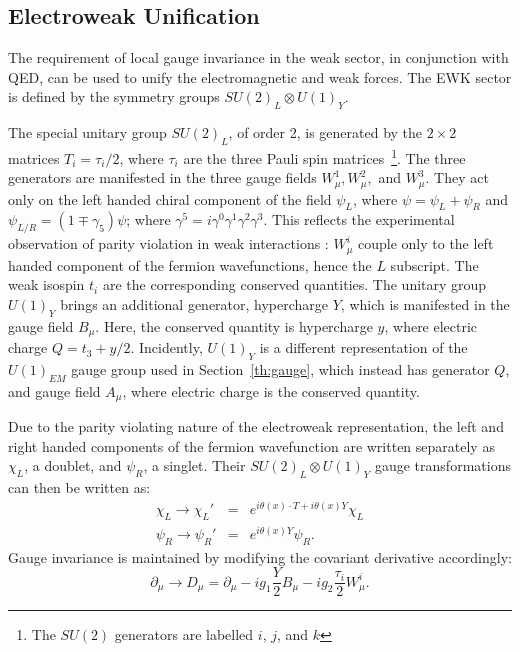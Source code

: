 \subsection{Electroweak Unification \label{th:EW}}
%
The requirement of local gauge invariance in the weak sector, in conjunction with \ac{QED}, can be used to unify the electromagnetic and weak forces. 
The \ac{EWK} sector is defined by the symmetry groups $SU(2)_{L} \otimes U(1)_{Y}$.
%

The special unitary group $SU(2)_{L}$, of order 2, 
is generated by the $2\times2$ matrices $T_{i} = \tau_{i}/2$, 
where $\tau_{i}$ are the three Pauli spin matrices~\footnote{The $SU(2)$ generators are labelled $i$, $j$, and $k$}.
The three generators are manifested in the three gauge fields 
$W^{1}_{\mu}, W^{2}_{\mu},$ and $W^{3}_{\mu}$. 
They act only on the left handed chiral component of the field $\psi_{L}$, 
where $\psi = \psi_{L} + \psi_{R}$ and $\psi_{L/R} = (1 \mp \gamma_{5})\psi$; 
where $\gamma^{5} = i\gamma^{0}\gamma^{1}\gamma^{2}\gamma^{3}$.
This reflects the experimental observation of parity violation in weak interactions%
: $W^{i}_{\mu}$ couple only to the left handed component of the fermion wavefunctions, hence the $L$ subscript. 
The weak isospin $t_{i}$ are the corresponding conserved quantities.
The unitary group $U(1)_{Y}$ brings an additional generator, hypercharge $Y$, which is manifested in the gauge field $B_{\mu}$. 
Here, the conserved quantity is hypercharge $y$, 
where electric charge $Q = t_{3} + y/2$.
Incidently, $U(1)_{Y}$ is a different representation of the $U(1)_{EM}$ gauge group used in Section~\ref{th:gauge}, 
which instead has generator $Q$, and gauge field $A_{\mu}$, where electric charge is the conserved quantity.




Due to the parity violating nature of the electroweak representation, the left and right handed components of the fermion wavefunction are written separately as $\chi_{L}$, a doublet, and $\psi_{R}$, a singlet. 
Their $SU(2)_{L} \otimes U(1)_{Y}$ gauge transformations can then be written as:
\begin{eqnarray}
\chi_{L} \rightarrow \chi_{L}' &=& e^{i \theta (x) \cdot T + i \theta (x) Y } \chi_{L} \\
\psi_{R} \rightarrow \psi_{R}' &=& e^{i \theta (x) Y } \psi_{R}.
\end{eqnarray}
Gauge invariance is maintained by modifying the covariant derivative accordingly:
\begin{equation}
\partial_{\mu} \rightarrow D_{\mu} = \partial_{\mu} - i g_{1} \frac{Y}{2} B_{\mu} - ig_{2} \frac{\tau_{i}}{2} W^{i}_{\mu}.
\label{eq:EWKcovariant}
\end{equation}

